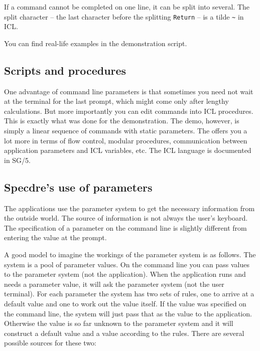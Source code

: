    If a command cannot be completed on one line, it can be split into
   several. The split character -- the last character before the
   splitting {\tt Return} -- is a tilde {\tt\~{}} in ICL.

   You can find real-life examples in the demonstration script.


\subsection{Scripts and procedures}

   One advantage of command line parameters is that sometimes you need
   not wait at the terminal for the last prompt, which might come only
   after lengthy calculations. But more importantly you can edit
   commands into ICL procedures. This is exactly what was done for the
   demonstration. The demo, however, is simply a linear sequence of
   commands with static parameters. The
   offers you a lot more in terms of flow control, modular procedures,
   communication between application parameters and ICL variables,
   etc. The ICL language is documented in SG/5.


\subsection{Specdre's use of parameters}

   The applications use the parameter system to get the necessary
   information from the outside world. The source of information is not
   always the user's keyboard. The specification of a parameter on the
   command line is slightly different from entering the value at the
   prompt.

   A good model to imagine the workings of the parameter system is as
   follows.  The system is a pool of parameter values. On the command
   line you can pass values to the parameter system (not the
   application). When the application runs and needs a parameter value,
   it will ask the parameter system (not the user terminal). For each
   parameter the system has two sets of rules, one to arrive at a
   default value and one to work out the value itself. If the value was
   specified on the command line, the system will just pass that as the
   value to the application. Otherwise the value is so far unknown to
   the parameter system and it will construct a default value and a
   value according to the rules. There are several possible sources for
   these two:

